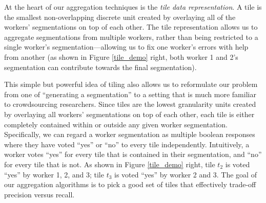 At the heart of our aggregation techniques is the \emph{tile data representation}. A tile is the smallest non-overlapping discrete unit created by overlaying all of the workers' segmentations on top of each other. %
The tile representation allows us to aggregate segmentations from multiple workers, rather than being restricted to a single worker's segmentation---allowing us to fix one worker's errors with help from another (as shown in Figure \ref{tile_demo} right, both worker 1 and 2's segmentation can contribute towards the final segmentation).
\par This simple but powerful idea of tiling also allows us to reformulate our problem from one of ``generating a segmentation'' to a setting that is much more familiar to crowdsourcing researchers. Since tiles are the lowest granularity units created by overlaying all workers' segmentations on top of each other, each tile is either completely contained within or outside any given worker segmentation. Specifically, we can regard a worker segmentation as multiple boolean responses where they have voted ``yes'' or ``no'' to every tile independently. Intuitively, a worker votes ``yes'' for every tile that is contained in their segmentation, and ``no'' for every tile that is not. As shown in Figure \ref{tile_demo} right, tile $t_2$ is voted ``yes'' by worker 1, 2, and 3; tile $t_3$ is voted ``yes'' by worker 2 and 3. The goal of our aggregation algorithms is to pick a good set of tiles that effectively trade-off precision versus recall.
